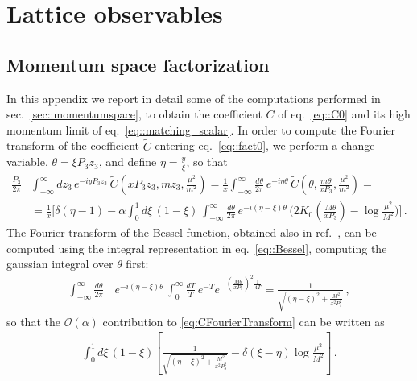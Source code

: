 \chapter{Lattice observables}
\label{app:scalar_lattice}
\section{Momentum space factorization}
\label{app:plus}

In this appendix we report in detail some of the computations performed in
sec.~\ref{sec::momentumspace}, to obtain the coefficient $C$ of
eq.~\eqref{eq::C0} and its high momentum limit of eq.~\eqref{eq::matching_scalar}. In
order to compute the Fourier transform of the coefficient $\tilde{C}$ entering
eq.~\eqref{eq::fact0}, we perform a change variable, $\theta = \xi P_3 z_3 $,
and define $\eta = \frac{y}{\xi}$, so that
\begin{align}
    \frac{P_3}{2\pi} 
    & \int_{-\infty}^{\infty} dz_3\,
        e^{-i y P_3 z_3}\,
        \tilde{C}\left(x P_3 z_3, m z_3, \frac{\mu^2}{m^2} \right)
        = \frac{1}{x} \int_{-\infty}^{\infty} \frac{d\theta}{2\pi}\,
        e^{-i \eta \theta}\,
        \tilde{C}\left(\theta, \frac{m \theta}{x P_3}, \frac{\mu^2}{m^2} \right)
        = \nonumber\\
    \label{eq:CFourierTransform}
    &= \frac{1}{x} \biggl[
        \delta\left(\eta-1\right) - \alpha \int_0^1 d\xi\, \left(1-\xi\right)\,
        \int_{-\infty}^{\infty} \frac{d\theta}{2\pi}\, 
        e^{-i \left(\eta-\xi\right) \theta} \,
        \biggl(2 K_0\left(\frac{M\theta}{x P_3}\right)
        -\log\frac{\mu^2}{M^2}\biggr)\biggr]\, .
\end{align}
The Fourier transform of the Bessel function, obtained also in ref.~\cite{Radyushkin:2016hsy}, can be computed using the integral
representation in eq.~\eqref{eq::Bessel}, computing the gaussian integral over
$\theta$ first:
\begin{align}
    \int_{-\infty}^{\infty} \frac{d\theta}{2\pi}\,
    & e^{-i \left(\eta-\xi\right)\theta}\,
    \int_0^{\infty} \frac{dT}{T}\, e^{-T} 
    e^{-\left(\frac{M\theta}{x P_3}\right)^2 \frac{1}{4T}} 
    =  \frac{1}{\sqrt{\left(\eta - \xi\right)^2 + \frac{M^2}{x^2 P_3^2}}}\, ,
\end{align}
so that the $\mathcal{O}(\alpha)$ contribution to \eqref{eq:CFourierTransform}
can be written as 
\begin{align}
    \label{eq::appC0}
    \int_0^1 d\xi\,
    \left(1-\xi\right) 
    \left[ \frac{1}{\sqrt{\left(\eta-\xi\right)^2 + \frac{M^2}{x^2P_3^2}}} 
    - \delta\left(\xi-\eta\right) \log\frac{\mu^2}{M^2}\right]\, .
\end{align}
